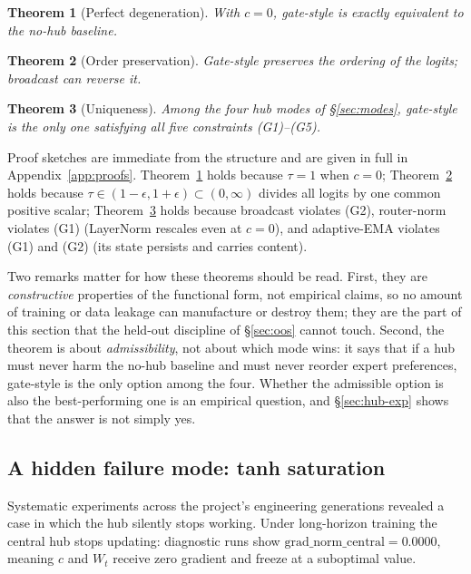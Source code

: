 \documentclass[10pt,twoside]{article}
\theoremstyle{definition}
\theoremstyle{plain}
\newtheorem{theorem}{Theorem}[section]
\theoremstyle{remark}
\begin{document}
\begin{theorem}[Perfect degeneration]
\label{thm:deg}
With $c=0$, gate-style is exactly equivalent to the no-hub baseline.
\end{theorem}

\begin{theorem}[Order preservation]
\label{thm:order}
Gate-style preserves the ordering of the logits; broadcast can reverse it.
\end{theorem}

\begin{theorem}[Uniqueness]
\label{thm:uniq}
Among the four hub modes of \S\ref{sec:modes}, gate-style is the only one satisfying all five constraints (G1)--(G5).
\end{theorem}

Proof sketches are immediate from the structure and are given in full in Appendix~\ref{app:proofs}. Theorem~\ref{thm:deg} holds because $\tau = 1$ when $c = 0$; Theorem~\ref{thm:order} holds because $\tau \in (1-\epsilon, 1+\epsilon) \subset (0,\infty)$ divides all logits by one common positive scalar; Theorem~\ref{thm:uniq} holds because broadcast violates (G2), router-norm violates (G1) (LayerNorm rescales even at $c=0$), and adaptive-EMA violates (G1) and (G2) (its state persists and carries content).

Two remarks matter for how these theorems should be read. First, they are \emph{constructive} properties of the functional form, not empirical claims, so no amount of training or data leakage can manufacture or destroy them; they are the part of this section that the held-out discipline of \S\ref{sec:oos} cannot touch. Second, the theorem is about \emph{admissibility}, not about which mode wins: it says that if a hub must never harm the no-hub baseline and must never reorder expert preferences, gate-style is the only option among the four. Whether the admissible option is also the best-performing one is an empirical question, and \S\ref{sec:hub-exp} shows that the answer is not simply yes.

\subsection{A hidden failure mode: tanh saturation}
\label{sec:diagnosis}

Systematic experiments across the project's engineering generations revealed a case in which the hub silently stops working. Under long-horizon training the central hub stops updating: diagnostic runs show $\text{grad\_norm\_central} = 0.0000$, meaning $c$ and $W_t$ receive zero gradient and freeze at a suboptimal value.
\end{document}
